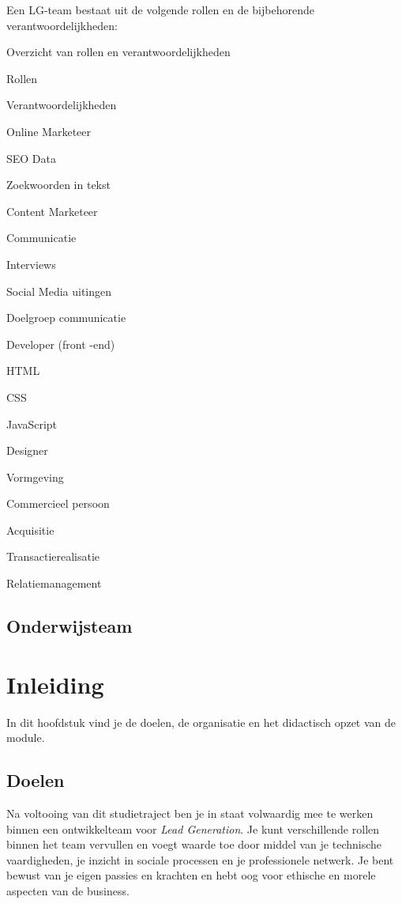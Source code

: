 \documentclass[]{book}
\begin{document}
Een LG-team bestaat uit de volgende rollen en de bijbehorende
verantwoordelijkheden:

\label{tab:unnamed-chunk-2}Overzicht van rollen en verantwoordelijkheden

Rollen

Verantwoordelijkheden

Online Marketeer

SEO Data

Zoekwoorden in tekst

Content Marketeer

Communicatie

Interviews

Social Media uitingen

Doelgroep communicatie

Developer (front -end)

HTML

CSS

JavaScript

Designer

Vormgeving

Commercieel persoon

Acquisitie

Transactierealisatie

Relatiemanagement

\section{Onderwijsteam}\label{onderwijsteam}

\chapter{Inleiding}\label{inleiding}

In dit hoofdstuk vind je de doelen, de organisatie en het didactisch
opzet van de module.

\section{Doelen}\label{doelen}

Na voltooing van dit studietraject ben je in staat volwaardig mee te
werken binnen een ontwikkelteam voor \emph{Lead Generation}. Je kunt
verschillende rollen binnen het team vervullen en voegt waarde toe door
middel van je technische vaardigheden, je inzicht in sociale processen
en je professionele netwerk. Je bent bewust van je eigen passies en
krachten en hebt oog voor ethische en morele aspecten van de business.
\end{document}
